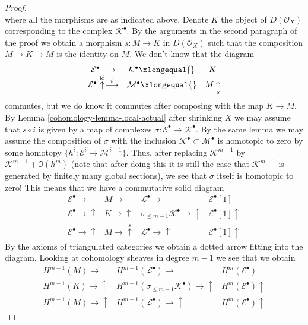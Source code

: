 \begin{proof}
$$$$
where all the morphisms are as indicated above.
Denote $K$ the object of $D(\mathcal{O}_X)$ corresponding to the complex
$\mathcal{K}^\bullet$.
By the arguments in the second paragraph of the proof we obtain
a morphism $s : M \to K$ in $D(\mathcal{O}_X)$ such that the composition
$M \to K \to M$ is the identity on $M$. We don't know that the
diagram
$$
\begin{array}{ccc}\mathcal{E}^\bullet \longrightarrow & \mathcal{K}^\bullet \xlongequal{} & K \\ \mathcal{E}^\bullet \overset{\text{id}}{\uparrow}\overset{i}{\longrightarrow} & \mathcal{M}^\bullet \xlongequal{} & M \underset{s}{\uparrow}\end{array}
$$
commutes, but we do know it commutes after composing with the
map $K \to M$. By Lemma \ref{cohomology-lemma-local-actual} after shrinking $X$ we may
assume that $s \circ i$ is given by a map of complexes
$\sigma : \mathcal{E}^\bullet \to \mathcal{K}^\bullet$.
By the same lemma we may assume the composition of $\sigma$
with the inclusion $\mathcal{K}^\bullet \subset \mathcal{M}^\bullet$
is homotopic to zero by some homotopy
$\{h^i : \mathcal{E}^i \to \mathcal{M}^{i - 1}\}$.
Thus, after replacing $\mathcal{K}^{m - 1}$ by
$\mathcal{K}^{m - 1} + \Im(h^m)$ (note that after doing this
it is still the case that $\mathcal{K}^{m - 1}$ is generated
by finitely many global sections), we see that
$\sigma$ itself is homotopic to zero!
This means that we have a commutative solid diagram
$$
\begin{array}{cccc}\mathcal{E}^\bullet \longrightarrow & M \longrightarrow & \mathcal{L}^\bullet \longrightarrow & \mathcal{E}^\bullet[1] \\ \mathcal{E}^\bullet \longrightarrow\uparrow & K \longrightarrow\uparrow & \sigma_{\leq m - 1}\mathcal{K}^\bullet \longrightarrow\uparrow & \mathcal{E}^\bullet[1] \uparrow \\ \mathcal{E}^\bullet \longrightarrow\uparrow & M \longrightarrow\overset{s}{\uparrow} & \mathcal{L}^\bullet \longrightarrow\uparrow & \mathcal{E}^\bullet[1] \uparrow\end{array}
$$
By the axioms of triangulated categories we obtain a dotted
arrow fitting into the diagram.
Looking at cohomology sheaves in degree $m - 1$ we see that we obtain
$$
\begin{array}{ccc}H^{m - 1}(M) \longrightarrow & H^{m - 1}(\mathcal{L}^\bullet) \longrightarrow & H^m(\mathcal{E}^\bullet) \\ H^{m - 1}(K) \longrightarrow\uparrow & H^{m - 1}(\sigma_{\leq m - 1}\mathcal{K}^\bullet) \longrightarrow\uparrow & H^m(\mathcal{E}^\bullet) \uparrow \\ H^{m - 1}(M) \longrightarrow\uparrow & H^{m - 1}(\mathcal{L}^\bullet) \longrightarrow\uparrow & H^m(\mathcal{E}^\bullet) \uparrow\end{array}
$$
\end{proof}
